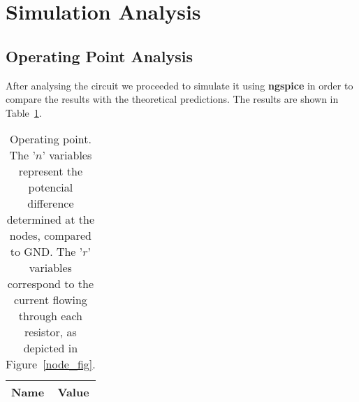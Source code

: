 \section{Simulation Analysis}
\label{sec:simulation}

\subsection{Operating Point Analysis}

After analysing the circuit we proceeded to simulate it using {\bf ngspice} in order to compare the results with the theoretical predictions. The results are shown in Table~\ref{tab:op}.


\begin{table}[h]
	\centering
	\begin{tabular}{|l|c|}
		\hline    
		{\bf Name} & {\bf Value} \\ \hline
		
	\end{tabular}
	\caption{Operating point. The '$n$' variables represent the potencial difference determined at the nodes, compared to GND. The '$r$' variables correspond to the current flowing through each resistor, as depicted in Figure~\ref{node_fig}.}
	\label{tab:op}
\end{table}

